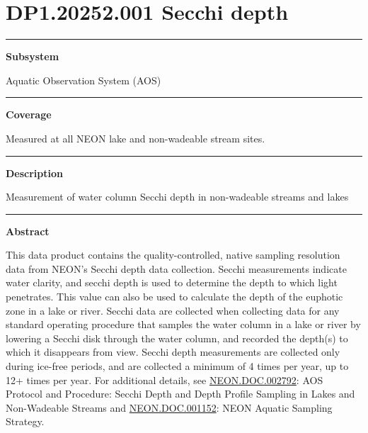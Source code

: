 \documentclass[]{article}
\begin{document}
\section{DP1.20252.001 Secchi depth}\label{dp1.20252.001-secchi-depth}

\begin{center}\rule{0.5\linewidth}{\linethickness}\end{center}

\textbf{Subsystem}

Aquatic Observation System (AOS)

\begin{center}\rule{0.5\linewidth}{\linethickness}\end{center}

\textbf{Coverage}

Measured at all NEON lake and non-wadeable stream sites.

\begin{center}\rule{0.5\linewidth}{\linethickness}\end{center}

\textbf{Description}

Measurement of water column Secchi depth in non-wadeable streams and
lakes

\begin{center}\rule{0.5\linewidth}{\linethickness}\end{center}

\textbf{Abstract}

This data product contains the quality-controlled, native sampling
resolution data from NEON's Secchi depth data collection. Secchi
measurements indicate water clarity, and secchi depth is used to
determine the depth to which light penetrates. This value can also be
used to calculate the depth of the euphotic zone in a lake or river.
Secchi data are collected when collecting data for any standard
operating procedure that samples the water column in a lake or river by
lowering a Secchi disk through the water column, and recorded the
depth(s) to which it disappears from view. Secchi depth measurements are
collected only during ice-free periods, and are collected a minimum of 4
times per year, up to 12+ times per year. For additional details, see
\href{http://data.neonscience.org/api/v0/documents/NEON.DOC.002792vB}{NEON.DOC.002792}:
AOS Protocol and Procedure: Secchi Depth and Depth Profile Sampling in
Lakes and Non-Wadeable Streams and
\href{data.neonscience.org/api/v0/documents/NEON.DOC.001152vA}{NEON.DOC.001152}:
NEON Aquatic Sampling Strategy.
\end{document}
